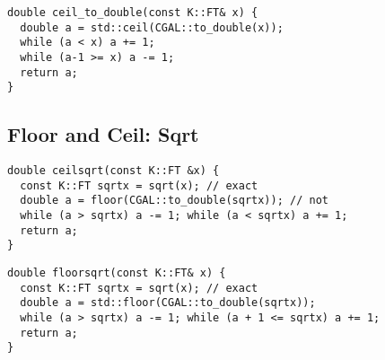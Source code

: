 \documentclass[guide.tex]{subfiles}
\begin{document}
\begin{verbatim}
double ceil_to_double(const K::FT& x) {
  double a = std::ceil(CGAL::to_double(x));
  while (a < x) a += 1;
  while (a-1 >= x) a -= 1;
  return a;
}
\end{verbatim}

\subsection{Floor and Ceil: Sqrt}
\begin{verbatim}
double ceilsqrt(const K::FT &x) {
  const K::FT sqrtx = sqrt(x); // exact
  double a = floor(CGAL::to_double(sqrtx)); // not
  while (a > sqrtx) a -= 1; while (a < sqrtx) a += 1;
  return a;
}
\end{verbatim}

\begin{verbatim}
double floorsqrt(const K::FT& x) {
  const K::FT sqrtx = sqrt(x); // exact
  double a = std::floor(CGAL::to_double(sqrtx));
  while (a > sqrtx) a -= 1; while (a + 1 <= sqrtx) a += 1;
  return a;
}
\end{verbatim}


\begin{verbatim}

\end{verbatim}


\begin{verbatim}

\end{verbatim}
\end{document}
